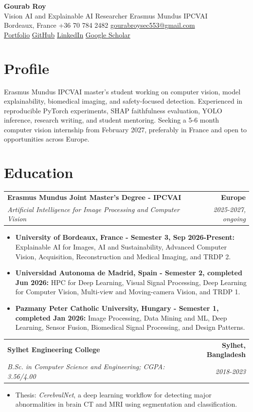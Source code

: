 \documentclass[10pt,a4paper]{article}
\makeatletter
\newcommand{\entry}[4]{%
  \begin{tabularx}{\textwidth}{@{}X r@{}}
    \textbf{#1} & \textbf{#2} \\
    \textit{#3} & \textit{#4}
  \end{tabularx}\vspace{-2pt}
}
\makeatother
\begin{document}
\color{ink}

\begin{center}
  {\Huge\bfseries Gourab Roy}\\[2pt]
  {\large\color{navy}Vision AI and Explainable AI Researcher \textbar{} Erasmus Mundus IPCVAI}\\[4pt]
  \small
  Bordeaux, France \textbar{} +36 70 784 2482 \textbar{}
  \href{mailto:gourabroysec553@gmail.com}{gourabroysec553@gmail.com}\\[2pt]
  \href{https://gourabroy551.github.io/}{Portfolio} \textbar{}
  \href{https://github.com/GourabRoy551}{GitHub} \textbar{}
  \href{https://www.linkedin.com/in/gourab-roy-5b52921a3/}{LinkedIn} \textbar{}
  \href{https://scholar.google.com/citations?hl=en\&user=_9tL56YAAAAJ}{Google Scholar}
\end{center}

\section{Profile}
Erasmus Mundus IPCVAI master's student working on computer vision, model explainability, biomedical imaging, and safety-focused detection. Experienced in reproducible PyTorch experiments, SHAP faithfulness evaluation, YOLO inference, research writing, and student mentoring. Seeking a 5-6 month computer vision internship from February 2027, preferably in France and open to opportunities across Europe.

\section{Education}
\entry{Erasmus Mundus Joint Master's Degree - IPCVAI}{Europe}{Artificial Intelligence for Image Processing and Computer Vision}{2025-2027, ongoing}
\begin{itemize}
  \item \textbf{University of Bordeaux, France - Semester 3, Sep 2026-Present:} Explainable AI for Images, AI and Sustainability, Advanced Computer Vision, Acquisition, Reconstruction and Medical Imaging, and TRDP 2.
  \item \textbf{Universidad Autonoma de Madrid, Spain - Semester 2, completed Jun 2026:} HPC for Deep Learning, Visual Signal Processing, Deep Learning for Computer Vision, Multi-view and Moving-camera Vision, and TRDP 1.
  \item \textbf{Pazmany Peter Catholic University, Hungary - Semester 1, completed Jan 2026:} Image Processing, Data Mining and ML, Deep Learning, Sensor Fusion, Biomedical Signal Processing, and Design Patterns.
\end{itemize}
\entry{Sylhet Engineering College}{Sylhet, Bangladesh}{B.Sc. in Computer Science and Engineering; CGPA: 3.56/4.00}{2018-2023}
\begin{itemize}
  \item Thesis: \textit{CerebralNet}, a deep learning workflow for detecting major abnormalities in brain CT and MRI using segmentation and classification.
\end{itemize}
\end{document}
